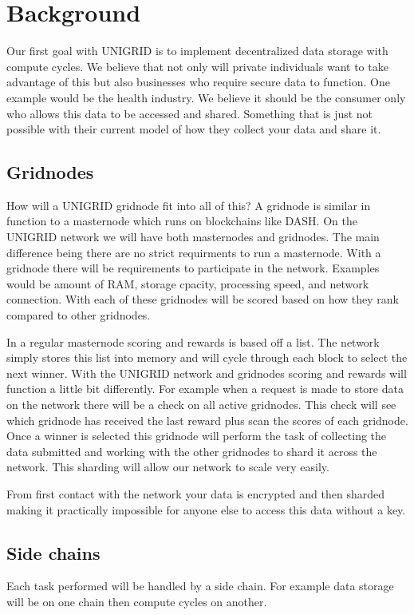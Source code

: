 \documentclass[12pt]{article}
\begin{document}
\section*{Background}
Our first goal with UNIGRID is to implement decentralized data storage with compute cycles. We believe that not only will private individuals want to take advantage of this but also businesses who require secure data to function. One example would be the health industry. We believe it should be the consumer only who allows this data to be accessed and shared. Something that is just not possible with their current model of how they collect your data and share it.

\subsection*{Gridnodes}


How will a UNIGRID gridnode fit into all of this? A gridnode is similar in function to a masternode which runs on blockchains like DASH. On the UNIGRID network we will have both masternodes and gridnodes. The main difference being there are no strict requirments to run a masternode. With a gridnode there will be requirements to participate in the network. Examples would be amount of RAM, storage cpacity, processing speed, and network connection. With each of these gridnodes will be scored based on how they rank compared to other gridnodes.

In a regular masternode scoring and rewards is based off a list. The network simply stores this list into memory and will cycle through each block to select the next winner. With the UNIGRID network and gridnodes scoring and rewards will function a little bit differently. For example when a request is made to store data on the network there will be a check on all active gridnodes. This check will see which gridnode has received the last reward plus scan the scores of each gridnode. Once a winner is selected this gridnode will perform the task of collecting the data submitted and working with the other gridnodes to shard it across the network. This sharding will allow our network to scale very easily.

From first contact with the network your data is encrypted and then sharded making it practically impossible for anyone else to access this data without a key.

\subsection*{Side chains}
Each task performed will be handled by a side chain. For example data storage will be on one chain then compute cycles on another. 
\end{document}
